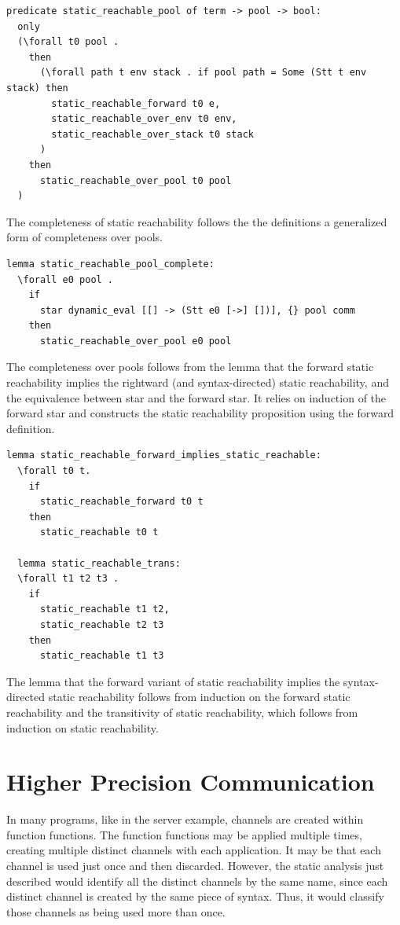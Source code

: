\documentclass[10pt]{article}
\begin{document}
\begin{lstlisting}[language=logic, mathescape]
  predicate static_reachable_pool of term -> pool -> bool:
  only
  (\forall t0 pool .
    then
      (\forall path t env stack . if pool path = Some (Stt t env stack) then 
        static_reachable_forward t0 e, 
        static_reachable_over_env t0 env, 
        static_reachable_over_stack t0 stack
      )
    then
      static_reachable_over_pool t0 pool
  )

\end{lstlisting}

The completeness of static reachability follows the the definitions
a generalized form of completeness over pools.

\begin{lstlisting}[language=logic, mathescape]
  lemma static_reachable_pool_complete:
  \forall e0 pool .
    if
      star dynamic_eval [[] -> (Stt e0 [->] [])], {} pool comm 
    then
      static_reachable_over_pool e0 pool
\end{lstlisting}

The completeness over pools follows from the lemma that the forward
static reachability implies the rightward (and syntax-directed) static reachability,
and the equivalence between star and the forward star.  It relies on induction of the
forward star and constructs the static reachability
proposition using the forward definition.  

\begin{lstlisting}[language=logic, mathescape]
  lemma static_reachable_forward_implies_static_reachable:
  \forall t0 t. 
    if
      static_reachable_forward t0 t
    then
      static_reachable t0 t

  lemma static_reachable_trans:
  \forall t1 t2 t3 .
    if 
      static_reachable t1 t2,
      static_reachable t2 t3
    then
      static_reachable t1 t3
\end{lstlisting}

The lemma that the forward variant of static reachability implies the syntax-directed static
reachability follows from induction on the forward static reachability and the
transitivity of static reachability, which follows from induction on static reachability.

\section{Higher Precision Communication}
In many programs, like in the server example, channels are created within function functions.
The function functions may be applied multiple times, creating multiple distinct channels
with each application. It may be that each channel is used just once and then discarded.
However, the static analysis just described would identify all the distinct channels by the
same name, since each distinct channel is created by the same piece of syntax.
Thus, it would classify those channels as being used more than once.
\end{document}
